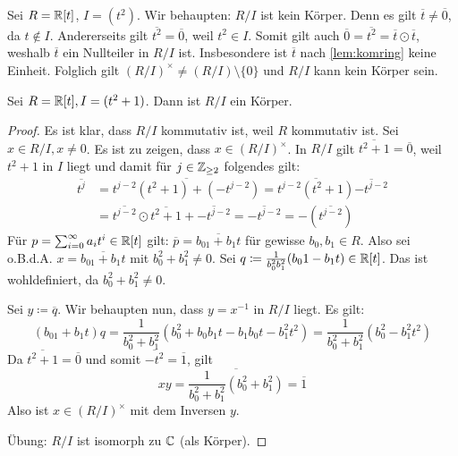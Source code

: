 \documentclass[12pt,a4paper]{scrartcl}
\begin{document}
\begin{bsp}
	Sei $R = \mathbb R[t]$, $I = (t^2)$. Wir behaupten: $R/I$ ist kein Körper. Denn es gilt $\overline{t} \neq \overline{0}$, da $t\notin I$. Andererseits gilt $\overline{t^2} = \overline{0}$, weil $t^2\in I$. Somit gilt auch $\overline{0} = \overline{t^2} = \overline{t}\odot\overline{t}$, weshalb $\overline{t}$ ein Nullteiler in $R/I$ ist. Insbesondere ist $\overline{t}$ nach \cref{lem:komring} keine Einheit. Folglich gilt $(R/I)^{\times} \neq (R/I)\setminus\{0\}$ und $R/I$ kann kein Körper sein.
\end{bsp}

\begin{bsp}
	Sei $R = \mathbb R [t], I = (t^2+1)$. Dann ist $R/I$ ein Körper.
\end{bsp}

\begin{proof}
	Es ist klar, dass $R/I$ kommutativ ist, weil $R$ kommutativ ist. Sei $x\in R/I, x\neq 0$. Es ist zu zeigen, dass $x\in (R/I)^{\times}$. In $R/I$ gilt $\overline{t^2+1} = \overline{0}$, weil $t^2+1$ in $I$ liegt und damit für $j\in \mathbb Z_{\geq 2}$ folgendes gilt:
	\begin{align*}
		\overline{t ^j} &= \overline{t^{j-2}(t^2+1)+(-t^{j-2})} = \overline{t^{j-2}(t^2+1)} \overline{-t^{j-2}} \\
		&= \overline{t^{j-2}}\odot \overline{t^2+1} + \overline{-t^{j-2}} = \overline{-t^{j-2}} = - (\overline{t^{j-2}})
	\end{align*}
	Für $p = \sum_{i = 0}^{\infty}a_it^i\in\mathbb R[t]$ gilt: $\overline{p} = \overline{b_01+b_1t}$ für gewisse $b_0,b_1\in R$. Also sei o.B.d.A. $x = \overline{b_01+b_1t}$ mit $b_0^2+b_1^2 \neq 0$. Sei $q \coloneqq \frac{1}{b_0^2b_1^2}(b_01-b_1t)\in \mathbb R[t]$. Das ist wohldefiniert, da $b_0^2+b_1^2 \neq 0$.
	
	Sei $y \coloneqq \overline{q}$. Wir behaupten nun, dass $y = x^{-1}$ in $R/I$ liegt. Es gilt: 
	$$ (b_01 +b_1t) q = \frac{1}{b_0^2+b_1^2}(b_0^2+b_0b_1t-b_1b_0t-b_1^2t^2) = \frac{1}{b_0^2+b_1^2}(b_0^2-b_1^2t^2)$$
	Da $\overline{t^2+1} = \overline{0}$ und somit $\overline{-t^2} = \overline{1}$, gilt 
	$$xy = \overline{\frac{1}{b_0^2+b_1^2}(b_0^2+b_1^2)} = \overline{1}$$
	Also ist $x\in (R/I)^{\times}$ mit dem Inversen $y$.
	
	Übung: $R/I$ ist isomorph zu $\mathbb C$ (als Körper).
\end{proof}
\end{document}
